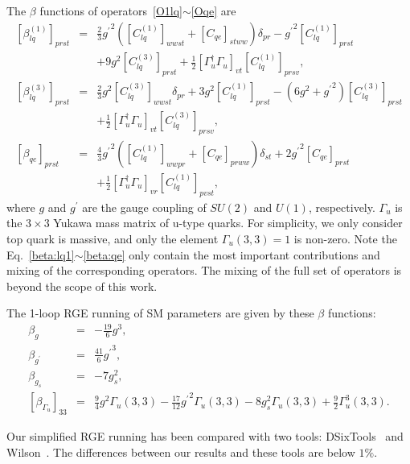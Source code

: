 \documentclass[a4paper,11pt]{article}
\begin{document}
The $\beta$ functions of operators~\ref{O1lq}$\sim$\ref{Oqe} are
\begin{eqnarray}
   \left[\beta^{(1)}_{lq}\right]_{prst} &=& \frac{2}{3}{g^\prime}^2\left([C^{(1)}_{lq}]_{wwst}+[C_{qe}]_{stww}\right)\delta_{pr}-{g^\prime}^2[C^{(1)}_{lq}]_{prst}  \nonumber \\
   &&+9g^2[C^{(3)}_{lq}]_{prst}+\frac{1}{2}[\Gamma_u^\dagger\Gamma_u]_{vt}[C^{(1)}_{lq}]_{prsv}, \label{beta:lq1}  \\
   \left[\beta^{(3)}_{lq}\right]_{prst} &=& \frac{2}{3}g^2[C^{(3)}_{lq}]_{wwst}\delta_{pr}+3g^2[C^{(1)}_{lq}]_{prst}-(6g^2+{g^\prime}^2)[C^{(3)}_{lq}]_{prst}  \nonumber \\ 
   && +\frac{1}{2}[\Gamma_u^\dagger\Gamma_u]_{vt}[C^{(3)}_{lq}]_{prsv}, \label{beta:lq3} \\
   \left[\beta_{qe}\right]_{prst} &=& \frac{4}{3}{g^{\prime}}^2\left([C^{(1)}_{lq}]_{wwpr}+[C_{qe}]_{prww}\right)\delta_{st}+2{g^{\prime}}^2[C_{qe}]_{prst} \nonumber  \\
   && +\frac{1}{2}[\Gamma_u^\dagger\Gamma_u]_{vr}[C^{(1)}_{lq}]_{pvst}, \label{beta:qe}
\end{eqnarray}
where $g$ and $g^\prime$ are the gauge coupling of $SU(2)$ and $U(1)$, respectively. 
$\Gamma_{u}$ is the $3\times 3$ Yukawa mass matrix of u-type quarks. 
For simplicity, we only consider top quark is massive, 
and only the element $\Gamma_u(3,3)=1$ is non-zero.
Note the Eq.~\ref{beta:lq1}$\sim$\ref{beta:qe} only contain the most important contributions and mixing of the corresponding operators. 
The mixing of the full set of operators is beyond the scope of this work. 

The 1-loop RGE running of SM parameters are given by these $\beta$ functions:
\begin{eqnarray}
  \beta_{g} &=& -\frac{19}{6}g^3,  \\
  \beta_{g^\prime} &=& \frac{41}{6}{g^\prime}^3,  \\
  \beta_{g_s} &=& -7g^2_s, \\
  \left[\beta_{\Gamma_u}\right]_{33} &=& \frac{9}{4}g^2\Gamma_u(3,3)-\frac{17}{12} {g^\prime}^2\Gamma_u(3,3)-8g^2_s\Gamma_u(3,3)+\frac{9}{2}\Gamma^3_u(3,3).
\end{eqnarray}

Our simplified RGE running has been compared with two tools: DSixTools~\cite{Celis:2017hod,Fuentes-Martin:2020zaz} and Wilson~\cite{Aebischer:2018bkb}.
The differences between our results and these tools are below $1\%$.
\end{document}
